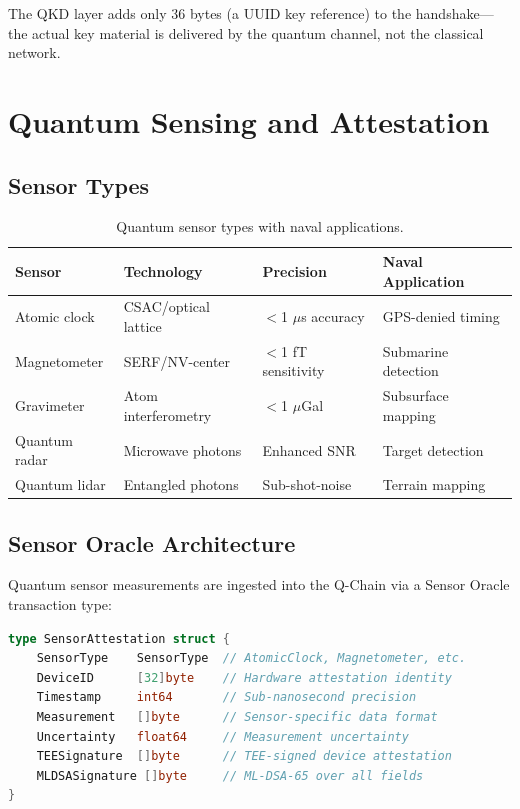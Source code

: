 \documentclass[11pt,letterpaper]{article}
\begin{document}
The QKD layer adds only 36 bytes (a UUID key reference) to the handshake---the actual key material is delivered by the quantum channel, not the classical network.

\section{Quantum Sensing and Attestation}

\subsection{Sensor Types}

\begin{table}[H]
\centering
\small
\begin{tabular}{@{}llll@{}}
\toprule
\textbf{Sensor} & \textbf{Technology} & \textbf{Precision} & \textbf{Naval Application} \\
\midrule
Atomic clock & CSAC/optical lattice & $<$1 $\mu$s accuracy & GPS-denied timing \\
Magnetometer & SERF/NV-center & $<$1 fT sensitivity & Submarine detection \\
Gravimeter & Atom interferometry & $<$1 $\mu$Gal & Subsurface mapping \\
Quantum radar & Microwave photons & Enhanced SNR & Target detection \\
Quantum lidar & Entangled photons & Sub-shot-noise & Terrain mapping \\
\bottomrule
\end{tabular}
\caption{Quantum sensor types with naval applications.}
\label{tab:sensors}
\end{table}

\subsection{Sensor Oracle Architecture}

Quantum sensor measurements are ingested into the Q-Chain via a Sensor Oracle transaction type:

\begin{lstlisting}[language=Go,caption={Sensor attestation transaction.}]
type SensorAttestation struct {
    SensorType    SensorType  // AtomicClock, Magnetometer, etc.
    DeviceID      [32]byte    // Hardware attestation identity
    Timestamp     int64       // Sub-nanosecond precision
    Measurement   []byte      // Sensor-specific data format
    Uncertainty   float64     // Measurement uncertainty
    TEESignature  []byte      // TEE-signed device attestation
    MLDSASignature []byte     // ML-DSA-65 over all fields
}
\end{lstlisting}
\end{document}
